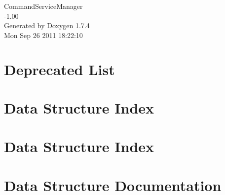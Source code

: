 \documentclass[a4paper]{book}
\begin{document}
\hypersetup{pageanchor=false}
\begin{titlepage}
\vspace*{7cm}
\begin{center}
{\Large CommandServiceManager \\[1ex]\large -\/1.00 }\\
\vspace*{1cm}
{\large Generated by Doxygen 1.7.4}\\
\vspace*{0.5cm}
{\small Mon Sep 26 2011 18:22:10}\\
\end{center}
\end{titlepage}
\clearemptydoublepage
{}
\tableofcontents
\clearemptydoublepage
{}
\hypersetup{pageanchor=true}
\chapter{Deprecated List}
\label{deprecated}
\hypertarget{deprecated}{}

\chapter{Data Structure Index}

\chapter{Data Structure Index}

\chapter{Data Structure Documentation}















\printindex
\end{document}
